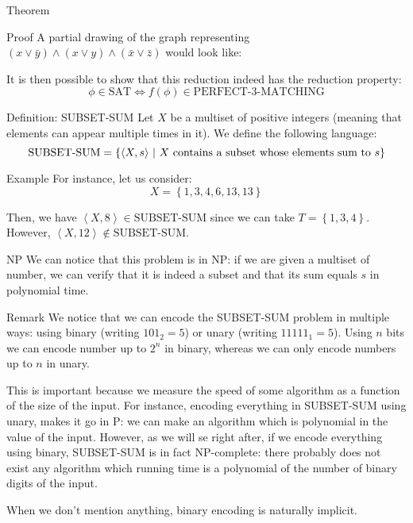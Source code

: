 \documentclass[a4paper]{article}
\begin{document}
\begin{parag}{Theorem}
\begin{subparag}{Proof}
        A partial drawing of the graph representing $\left(x \lor \bar{y}\right) \land \left(x \lor y\right) \land \left(\bar{x} \lor \bar{z}\right)$ would look like:

        It is then possible to show that this reduction indeed has the reduction property:
        \[\phi \in \text{SAT} \iff f\left(\phi\right) \in \text{PERFECT-3-MATCHING}\]
    \end{subparag}
\end{parag}

\begin{parag}{Definition: SUBSET-SUM}
    Let $X$ be a multiset of positive integers (meaning that elements can appear multiple times in it). We define the following language: 
    \[\text{SUBSET-SUM} = \left\{\left\langle X, s \right\rangle \suchthat \text{$X$ contains a subset whose elements sum to $s$}\right\}\]
    
    \begin{subparag}{Example}
        For instance, let us consider: 
        \[X = \left\{1, 3, 4, 6, 13, 13\right\}\]
        
        Then, we have $\left\langle X, 8 \right\rangle \in \text{SUBSET-SUM}$ since we can take $T = \left\{1, 3, 4\right\}$. However, $\left\langle X, 12 \right\rangle \not \in \text{SUBSET-SUM}$.
    \end{subparag}

    \begin{subparag}{NP}
        We can notice that this problem is in NP: if we are given a multiset of number, we can verify that it is indeed a subset and that its sum equals $s$ in polynomial time.
    \end{subparag}
\end{parag}

\begin{parag}{Remark}
    We notice that we can encode the SUBSET-SUM problem in multiple ways: using binary (writing $101_2 = 5$) or unary (writing $11111_1 = 5$). Using $n$ bits we can encode number up to $2^n$ in binary, whereas we can only encode numbers up to $n$ in unary.

    This is important because we measure the speed of some algorithm as a function of the size of the input. For instance, encoding everything in SUBSET-SUM using unary, makes it go in P: we can make an algorithm which is polynomial in the value of the input. However, as we will se right after, if we encode everything using binary, SUBSET-SUM is in fact NP-complete: there probably does not exist any algorithm which running time is a polynomial of the number of binary digits of the input.

    When we don't mention anything, binary encoding is naturally implicit.
\end{parag}
\end{document}
